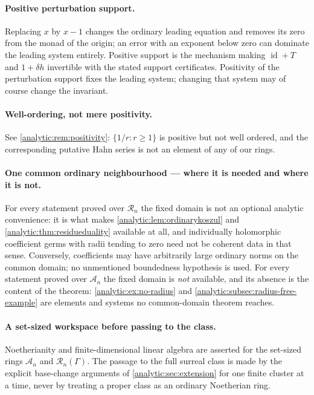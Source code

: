 \documentclass[11pt,letterpaper]{article}
\theoremstyle{definition}
\theoremstyle{remark}
\newcommand{\A}{\mathscr A}
\newcommand{\RR}{\mathscr R}
\newcommand{\id}{\operatorname{id}}
\numberwithin{equation}{section}
\begin{document}
\paragraph{Positive perturbation support.}
Replacing $x$ by $x-1$ changes the ordinary leading equation and removes its
zero from the monad of the origin; an error with an exponent below zero can
dominate the leading system entirely. Positive support is the mechanism
making $\id+T$ and $1+\delta h$ invertible with the stated support
certificates. Positivity of the perturbation support fixes the leading
system; changing that system may of course change the invariant.

\paragraph{Well-ordering, not mere positivity.}
See \cref{analytic:rem:positivity}: $\{1/r:r\ge1\}$ is positive but not well
ordered, and the corresponding putative Hahn series is not an element of any
of our rings.

\paragraph{One common ordinary neighbourhood --- where it is needed and
where it is not.}
For every statement proved over $\RR_n$ the fixed domain is not an optional
analytic convenience: it is what makes
\cref{analytic:lem:ordinarykoszul} and
\cref{analytic:thm:residueduality} available at all, and individually
holomorphic coefficient germs with radii tending to zero need not be
coherent data in that sense. Conversely, coefficients may have arbitrarily
large ordinary norms on the common domain; no unmentioned boundedness
hypothesis is used. For every statement proved over $\A_n$ the fixed domain
is \emph{not} available, and its absence is the content of the theorem:
\cref{analytic:ex:no-radius} and
\cref{analytic:subsec:radius-free-example} are elements and systems no
common-domain theorem reaches.

\paragraph{A set-sized workspace before passing to the class.}
Noetherianity and finite-dimensional linear algebra are asserted for the
set-sized rings $\A_n$ and $\RR_n(\Gamma)$. The passage to the full surreal
class is made by the explicit base-change arguments of
\cref{analytic:sec:extension} for one finite cluster at a time, never by
treating a proper class as an ordinary Noetherian ring.
\end{document}
